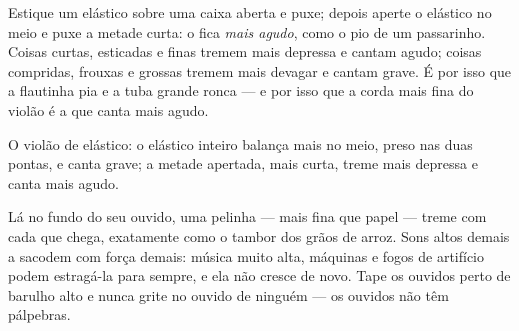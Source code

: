 \begin{example}\label{ex:g3:sound-around-us:pitch}
Estique um elástico sobre uma caixa aberta e puxe; depois aperte o
elástico no meio e puxe a metade curta: o  fica \emph{mais agudo},
como o pio de um passarinho. Coisas curtas, esticadas e finas tremem
mais depressa e cantam agudo; coisas compridas, frouxas e grossas
tremem mais devagar e cantam grave. É por isso que a flautinha pia e
a tuba grande ronca --- e por isso que a corda mais fina do violão é
a que canta mais agudo.
\end{example}

\begin{omfigure}

{\small O violão de elástico: o elástico inteiro balança mais no
meio, preso nas duas pontas, e canta grave; a metade apertada, mais
curta, treme mais depressa e canta mais agudo.}
\end{omfigure}

\begin{remark}\label{rem:g3:sound-around-us:ears}
Lá no fundo do seu ouvido, uma pelinha --- mais fina que papel ---
treme com cada  que chega, exatamente como o tambor dos grãos de
arroz. Sons altos demais a sacodem com força demais: música muito
alta, máquinas e fogos de artifício podem estragá-la para sempre, e
ela não cresce de novo. Tape os ouvidos perto de barulho alto e nunca
grite no ouvido de ninguém --- os ouvidos não têm pálpebras.
\end{remark}

